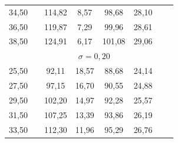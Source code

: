 \documentclass{article}
\begin{document}
\begin{appendices}
\begin{table}[h]
{\begin{tabular}{cXcccccr}
         34{,}50   &&     114{,}82     &     8{,}57&         98{,}68     &    28{,}10 \\
         36{,}50    &&    119{,}87     &     7{,}29&         99{,}96    &     28{,}61 \\
         38{,}50    &&    124{,}91     &     6{,}17&        101{,}08&         29{,}06 \\
      \hline 
      &\multicolumn{5}{c}{$\sigma=0{,}20$} \\
      \hline 
         25{,}50  &&       92{,}11   &      18{,}57  &       88{,}68 &        24{,}14\\
         27{,}50  &&       97{,}15   &      16{,}70  &       90{,}55 &        24{,}88\\
         29{,}50  &&      102{,}20   &      14{,}97  &       92{,}28 &        25{,}57\\
         31{,}50  &&      107{,}25   &      13{,}39  &       93{,}86 &        26{,}19\\
         33{,}50  &&      112{,}30   &      11{,}96  &       95{,}29 &        26{,}76\\

\end{tabular}}
\end{table}
\end{appendices}
\end{document}
